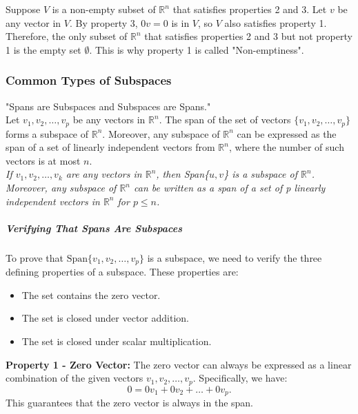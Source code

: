 \documentclass[a4paper,12pt]{article}
\begin{document}
\begin{tcolorbox}[title=Attention!, colframe=blue!70!black, colback=blue!5!white]
Suppose \( V \) is a non-empty subset of \( \mathbb{R}^n \) that satisfies properties 2 and 3. Let \( v \) be any vector in \( V \). By property 3, \( 0v = 0 \) is in \( V \), so \( V \) also satisfies property 1. Therefore, the only subset of \( \mathbb{R}^n \) that satisfies properties 2 and 3 but not property 1 is the empty set \( \emptyset \). This is why property 1 is called "Non-emptiness".

\end{tcolorbox}

\subsubsection{Common Types of Subspaces}

\begin{tcolorbox}[title=Theorem, colframe=blue!70!black, colback=blue!5!white]
"Spans are Subspaces and Subspaces are Spans."\\
Let \( v_1, v_2, \dots, v_p \) be any vectors in \( \mathbb{R}^n \). The span of the set of vectors \( \{ v_1, v_2, \dots, v_p \} \) forms a subspace of \( \mathbb{R}^n \). Moreover, any subspace of \( \mathbb{R}^n \) can be expressed as the span of a set of linearly independent vectors from \( \mathbb{R}^n \), where the number of such vectors is at most \( n \).\\
\textit{If $v_1, v_2,\dots, v_k$ are any vectors in \(\mathbb{R}^n\), then Span\{$u,v$\} is a subspace of \(\mathbb{R}^n\). Moreover, any subspace of \(\mathbb{R}^n\) can be written as a span of a set of p linearly independent vectors in \(\mathbb{R}^n\) for \(p \le n\).}
\end{tcolorbox}


\subparagraph{Verifying That Spans Are Subspaces\\}
To prove that \( \text{Span} \{ v_1, v_2, \dots, v_p \} \) is a subspace, we need to verify the three defining properties of a subspace. These properties are:
\begin{itemize}
    \item The set contains the zero vector.
    \item The set is closed under vector addition.
    \item The set is closed under scalar multiplication.
\end{itemize}

\textbf{Property 1 - Zero Vector:}
The zero vector can always be expressed as a linear combination of the given vectors \( v_1, v_2, \dots, v_p \). Specifically, we have:
\[
0 = 0v_1 + 0v_2 + \dots + 0v_p.
\]
This guarantees that the zero vector is always in the span.
\end{document}
